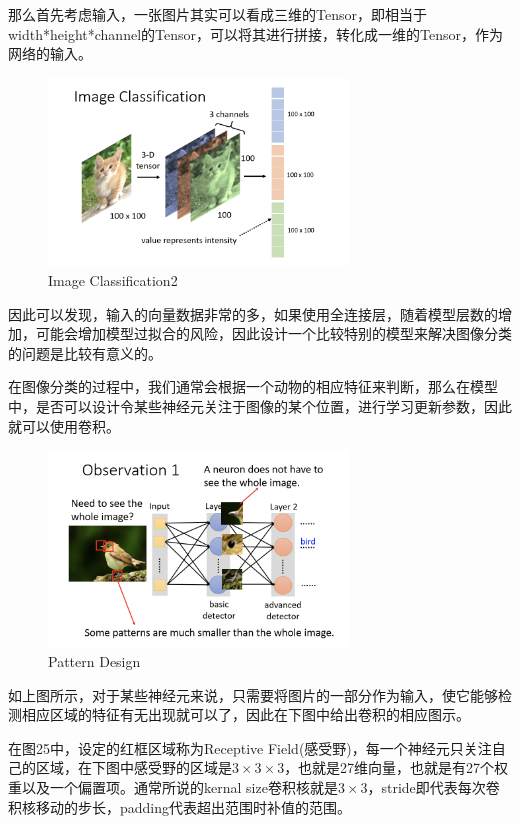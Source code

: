 \documentclass{article}
\begin{document}
\indent 那么首先考虑输入，一张图片其实可以看成三维的Tensor，即相当于width*height*channel的Tensor，可以将其进行拼接，转化成一维的Tensor，作为网络的输入。\par
\begin{figure}[H]
    \centering
    \includegraphics[width=8cm]{picture/ImageClassification.png}
    \caption{Image Classification2}
    \label{fig:galxy}
\end{figure}
\indent 因此可以发现，输入的向量数据非常的多，如果使用全连接层，随着模型层数的增加，可能会增加模型过拟合的风险，因此设计一个比较特别的模型来解决图像分类的问题是比较有意义的。\par
\indent 在图像分类的过程中，我们通常会根据一个动物的相应特征来判断，那么在模型中，是否可以设计令某些神经元关注于图像的某个位置，进行学习更新参数，因此就可以使用卷积。
\begin{figure}[H]
    \centering
    \includegraphics[width=8cm]{picture/PatternDesign.png}
    \caption{Pattern Design}
    \label{fig:galxy}
\end{figure}
\indent 如上图所示，对于某些神经元来说，只需要将图片的一部分作为输入，使它能够检测相应区域的特征有无出现就可以了，因此在下图中给出卷积的相应图示。\par
\indent 在图25中，设定的红框区域称为Receptive Field(感受野)，每一个神经元只关注自己的区域，在下图中感受野的区域是\(3 \times 3 \times 3\)，也就是27维向量，也就是有27个权重以及一个偏置项。通常所说的kernal size卷积核就是\(3 \times 3\)，stride即代表每次卷积核移动的步长，padding代表超出范围时补值的范围。
\end{document}
